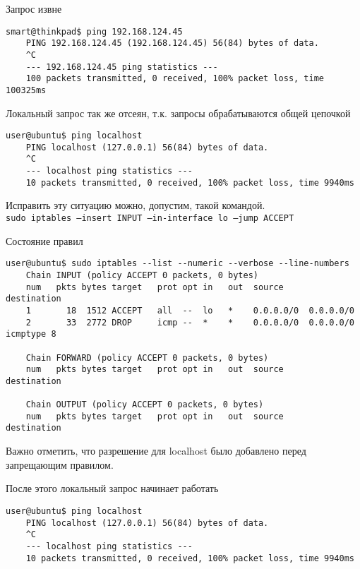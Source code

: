 Запрос извне
\begin{Verbatim}[frame=single,breaklines=true,breakanywhere=true]
    smart@thinkpad$ ping 192.168.124.45
    PING 192.168.124.45 (192.168.124.45) 56(84) bytes of data.
    ^C
    --- 192.168.124.45 ping statistics ---
    100 packets transmitted, 0 received, 100% packet loss, time 100325ms
\end{Verbatim}

Локальный запрос так же отсеян, т.к. запросы обрабатываются общей цепочкой
\begin{Verbatim}[frame=single,breaklines=true,breakanywhere=true]
    user@ubuntu$ ping localhost 
    PING localhost (127.0.0.1) 56(84) bytes of data.
    ^C
    --- localhost ping statistics ---
    10 packets transmitted, 0 received, 100% packet loss, time 9940ms
\end{Verbatim}

Исправить эту ситуацию можно, допустим, такой командой.\\
\texttt{sudo iptables --insert INPUT --in-interface lo --jump ACCEPT}

Состояние правил
\begin{Verbatim}[frame=single,breaklines=true,breakanywhere=true]
    user@ubuntu$ sudo iptables --list --numeric --verbose --line-numbers
    Chain INPUT (policy ACCEPT 0 packets, 0 bytes)
    num   pkts bytes target   prot opt in   out  source     destination
    1       18  1512 ACCEPT   all  --  lo   *    0.0.0.0/0  0.0.0.0/0   
    2       33  2772 DROP     icmp --  *    *    0.0.0.0/0  0.0.0.0/0    icmptype 8

    Chain FORWARD (policy ACCEPT 0 packets, 0 bytes)
    num   pkts bytes target   prot opt in   out  source     destination

    Chain OUTPUT (policy ACCEPT 0 packets, 0 bytes)
    num   pkts bytes target   prot opt in   out  source     destination
\end{Verbatim}

Важно отметить, что разрешение для localhost было добавлено перед запрещающим правилом.

После этого локальный запрос начинает работать
\begin{Verbatim}[frame=single,breaklines=true,breakanywhere=true]
    user@ubuntu$ ping localhost 
    PING localhost (127.0.0.1) 56(84) bytes of data.
    ^C
    --- localhost ping statistics ---
    10 packets transmitted, 0 received, 100% packet loss, time 9940ms
\end{Verbatim}

